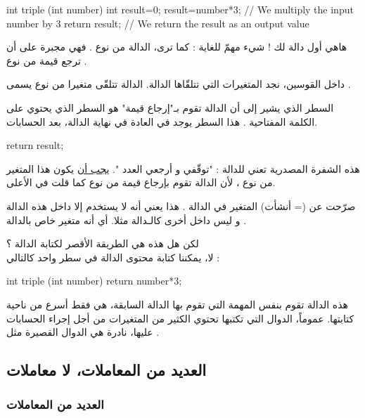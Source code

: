 \begin{Csource}
int triple (int number)
{
	int result=0;
	result=number*3; // We multiply the input number by 3
	return result; // We return the result as an output value
}
\end{Csource}

هاهي أول دالة لك ! شيء مهمّ للغاية : كما ترى، الدالة من نوع 
.
فهي مجبرة على  أن ترجع قيمة من نوع
.

داخل القوسين، نجد المتغيرات التي تتلقّاها الدالة. الدالة 
تتلقّى متغيرا من نوع 
يسمى 
.

السطر الذي يشير إلى أن الدالة تقوم بـ"إرجاع قيمة" هو السطر الذي يحتوي على الكلمة المفتاحية 
.
هذا السطر يوجد في العادة في نهاية الدالة، بعد الحسابات.

\begin{Csource}
return result;
\end{Csource}

هذه الشفرة المصدرية تعني للدالة : "توقّفي و أرجعي العدد 
".
\underline{يجب أن}
يكون هذا المتغير
من نوع
،
لأن الدالة تقوم بإرجاع قيمة من نوع
كما قلت في الأعلى.

صرّحت عن (= أنشأت) المتغير 
في الدالة 
.
هذا يعني أنه لا يستخدم إلا داخل هذه الدالة و ليس داخل أخرى كالـدالة
مثلا. أي أنه متغير خاص بالدالة 
.

لكن هل هذه هي الطريقة الأقصر لكتابة الدالة
 ؟\\
لا، يمكننا كتابة محتوى الدالة في سطر واحد كالتالي :

\begin{Csource}
int triple (int number)
{
	return number*3;
}
\end{Csource}

هذه الدالة تقوم بنفس المهمة التي تقوم بها الدالة السابقة، هي فقط أسرع من ناحية كتابتها. عموماً، الدوال التي تكتبها تحتوي الكثير من المتغيرات من أجل إجراء الحسابات عليها، نادرة هي الدوال القصيرة مثل
.

\subsection{العديد من المعاملات، لا معاملات}

\subsubsection{العديد من المعاملات}

